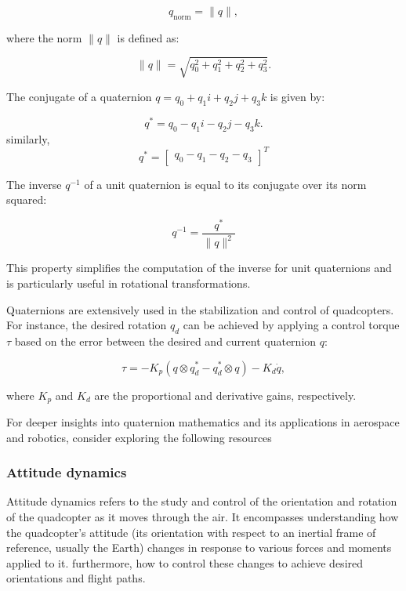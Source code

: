 \documentclass{article}
\begin{document}
\begin{equation}
q_{\text{norm}} = {\|q\|},
\end{equation}

where the norm \( \|q\| \) is defined as:

\begin{equation}
\|q\| = \sqrt{q_0^2 + q_1^2 + q_2^2 + q_3^2}.
\end{equation}

The conjugate of a quaternion \( q = q_0 + q_1i + q_2j + q_3k \) is given by:

\begin{equation}
q^* = q_0 - q_1i - q_2j - q_3k.
\end{equation}
similarly,
\begin{equation}
q^* = \begin{bmatrix} q_0 - q_1 - q_2 - q_3\end{bmatrix}^T
\end{equation}

The inverse \( q^{-1} \) of a unit quaternion is equal to its conjugate over its norm squared:

\begin{equation}
q^{-1} = \frac{q^*}{\|q\| ^2}
\end{equation}

This property simplifies the computation of the inverse for unit quaternions and is particularly useful in rotational transformations.

Quaternions are extensively used in the stabilization and control of quadcopters. For instance, the desired rotation \( q_d \) can be achieved by applying a control torque \( \tau \) based on the error between the desired and current quaternion \( q \):

\begin{equation}
\tau = -K_p(q \otimes q_d^* - q_d^* \otimes q) - K_d\dot{q},
\end{equation}

where \( K_p \) and \( K_d \) are the proportional and derivative gains, respectively.

For deeper insights into quaternion mathematics and its applications in aerospace and robotics, consider exploring the following resources \cite{Kuipers1999} \cite{quaternion_curves} \cite{QuaternionBasedAttitudeControl}

\subsubsection{Attitude dynamics}
Attitude dynamics refers to the study and control of the orientation and rotation of the quadcopter as it moves through the air. It encompasses understanding how the quadcopter's attitude (its orientation with respect to an inertial frame of reference, usually the Earth) changes in response to various forces and moments applied to it. furthermore, how to control these changes to achieve desired orientations and flight paths.
\end{document}
